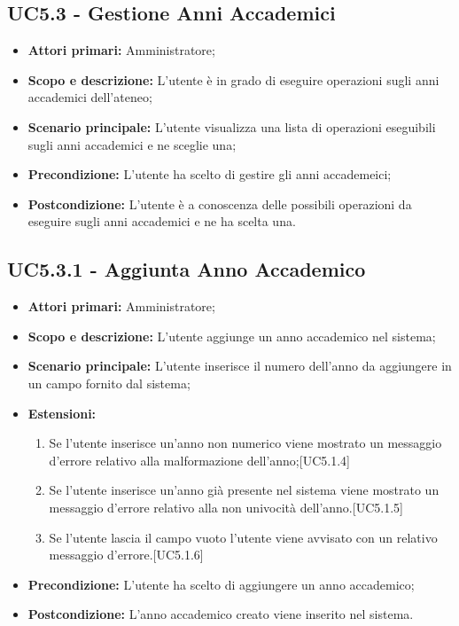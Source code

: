 \documentclass[AnalisiDeiRequisiti.tex]{subfiles}
\begin{document}
\subsection{UC5.3 - Gestione Anni Accademici}
\begin{itemize}
	\item \textbf{Attori primari:} Amministratore;
	\item \textbf{Scopo e descrizione:} L'utente è in grado di eseguire operazioni sugli anni accademici dell'ateneo;
	\item \textbf{Scenario principale:} L'utente visualizza una lista di operazioni eseguibili sugli anni accademici e ne sceglie una;
	\item \textbf{Precondizione:} L'utente ha scelto di gestire gli anni accademeici; 
	\item \textbf{Postcondizione:} L'utente è a conoscenza delle possibili operazioni da eseguire sugli anni accademici e ne ha scelta una.
\end{itemize}
\subsection{UC5.3.1 - Aggiunta Anno Accademico}
\begin{itemize}
	\item \textbf{Attori primari:} Amministratore;
	\item \textbf{Scopo e descrizione:} L'utente aggiunge un anno accademico nel sistema;
	\item \textbf{Scenario principale:} L'utente inserisce il numero dell'anno da aggiungere in un campo fornito dal sistema;
	\item \textbf{Estensioni:}
	\begin{enumerate}
		\item Se l'utente inserisce un'anno non numerico viene mostrato un messaggio d'errore relativo alla malformazione dell'anno;[UC5.1.4]
		\item Se l'utente inserisce un'anno già presente nel sistema viene mostrato un messaggio d'errore relativo alla non univocità dell'anno.[UC5.1.5]
		\item Se l'utente lascia il campo vuoto l'utente viene avvisato con un relativo messaggio d'errore.[UC5.1.6]
	\end{enumerate}
	\item \textbf{Precondizione:} L'utente ha scelto di aggiungere un anno accademico; 
	\item \textbf{Postcondizione:} L'anno accademico creato viene inserito nel sistema.
\end{itemize}
\end{document}
